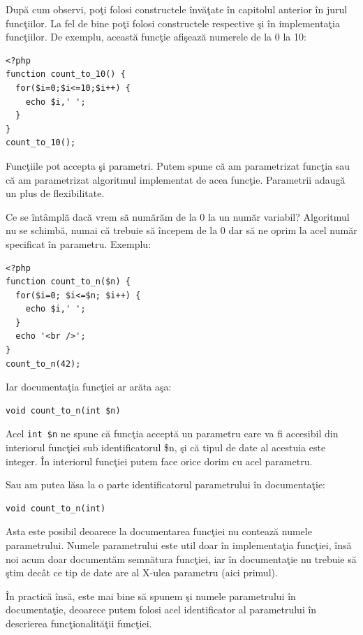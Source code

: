 După cum observi, poţi folosi constructele învăţate în capitolul anterior în
jurul funcţiilor. La fel de bine poţi folosi constructele respective
şi în implementaţia funcţiilor. De exemplu, această funcţie afişează numerele
de la 0 la 10:
\begin{lstlisting}
<?php
function count_to_10() {
  for($i=0;$i<=10;$i++) {
	echo $i,' ';
  }
}
count_to_10();
\end{lstlisting}

Funcţiile pot accepta şi parametri. Putem spune că am parametrizat
funcţia sau că am parametrizat algoritmul implementat de acea funcţie. Parametrii
adaugă un plus de flexibilitate.


Ce se întâmplă dacă vrem să numărăm
de la 0 la un număr variabil? Algoritmul nu se schimbă, numai că
trebuie să începem de la 0 dar să ne oprim la acel număr specificat
în parametru. Exemplu:
\begin{lstlisting}
<?php
function count_to_n($n) {
  for($i=0; $i<=$n; $i++) {
	echo $i,' ';
  }
  echo '<br />';
}
count_to_n(42);
\end{lstlisting}
Iar documentaţia funcţiei ar arăta aşa:
\begin{verbatim}
void count_to_n(int $n)
\end{verbatim}

Acel \texttt{int \$n} ne spune că funcţia acceptă un parametru care va fi accesibil
din interiorul funcţiei sub identificatorul \$n, şi că tipul de date al acestuia
este integer. În interiorul funcţiei putem face orice dorim cu acel parametru.

Sau am putea lăsa la o parte identificatorul parametrului în documentaţie:
\begin{verbatim}
void count_to_n(int)
\end{verbatim}
Asta este posibil deoarece la documentarea funcţiei nu contează numele parametrului.
Numele parametrului este util doar în implementaţia funcţiei, însă noi acum
doar documentăm semnătura funcţiei, iar în documentaţie nu trebuie să ştim
decât ce tip de date are al X-ulea parametru (aici primul).

În practică însă, este mai bine să spunem şi numele parametrului în documentaţie,
deoarece putem folosi acel identificator al parametrului în descrierea funcţionalităţii
funcţiei.


